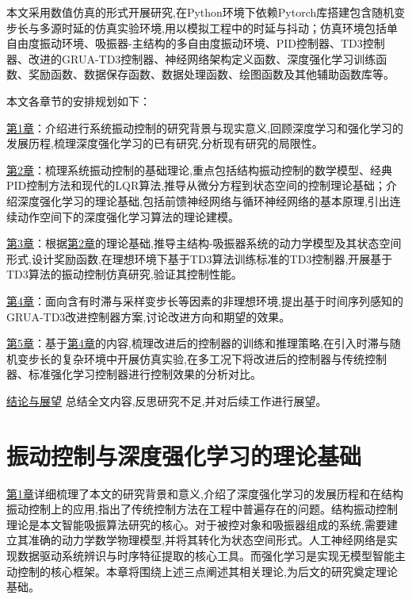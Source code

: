 \documentclass{scrbook}
\begin{document}
{本文采用数值仿真的形式开展研究,在Python环境下依赖Pytorch库搭建包含随机变步长与多源时延的仿真实验环境,用以模拟工程中的时延与抖动；仿真环境包括单自由度振动环境、吸振器-主结构的多自由度振动环境、PID控制器、TD3控制器、改进的GRUA-TD3控制器、神经网络架构定义函数、深度强化学习训练函数、奖励函数、数据保存函数、数据处理函数、绘图函数及其他辅助函数库等。

本文各章节的安排规划如下：

{\hyperref[ref-003]{第1章}}：介绍进行系统振动控制的研究背景与现实意义,回顾深度学习和强化学习的发展历程,梳理深度强化学习的已有研究,分析现有研究的局限性。

{\hyperref[ref-015]{第2章}}：梳理系统振动控制的基础理论,重点包括结构振动控制的数学模型、经典PID控制方法和现代的LQR算法,推导从微分方程到状态空间的控制理论基础；介绍深度强化学习的理论基础,包括前馈神经网络与循环神经网络的基本原理,引出连续动作空间下的深度强化学习算法的理论建模。

{\hyperref[ref-041]{第3章}}：根据{\hyperref[ref-015]{第2章}}的理论基础,推导主结构-吸振器系统的动力学模型及其状态空间形式,设计奖励函数,在理想环境下基于TD3算法训练标准的TD3控制器,开展基于TD3算法的振动控制仿真研究,验证其控制性能。

{\hyperref[ref-058]{第4章}}：面向含有时滞与采样变步长等因素的非理想环境,提出基于时间序列感知的GRUA-TD3改进控制器方案,讨论改进方向和期望的效果。

{\hyperref[ref-070]{第5章}}：基于{\hyperref[ref-058]{第4章}}的内容,梳理改进后的控制器的训练和推理策略,在引入时滞与随机变步长的复杂环境中开展仿真实验,在多工况下将改进后的控制器与传统控制器、标准强化学习控制器进行控制效果的分析对比。

{\hyperref[ref-094]{结论与展望}} 总结全文内容,反思研究不足,并对后续工作进行展望。

\chapter{\label{ref-015}\newline
\label{ref-016}振动控制与深度强化学习的理论基础\label{mark-第2章}}

{\hyperref[ref-002]{第1章}}详细梳理了本文的研究背景和意义,介绍了深度强化学习的发展历程和在结构振动控制上的应用,指出了传统控制方法在工程中普遍存在的问题。结构振动控制理论是本文智能吸振算法研究的核心。对于被控对象和吸振器组成的系统,需要建立其准确的动力学数学物理模型,并将其转化为状态空间形式。人工神经网络是实现数据驱动系统辨识与时序特征提取的核心工具。而强化学习是实现无模型智能主动控制的核心框架。本章将围绕上述三点阐述其相关理论,为后文的研究奠定理论基础。

}
\end{document}
